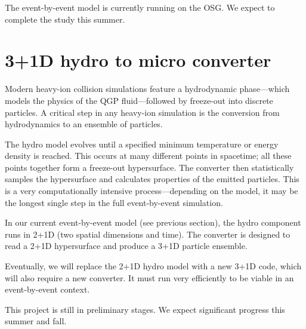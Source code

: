 \documentclass[twocolumn,10pt,amsmath]{revtex4-1}
\begin{document}
The event-by-event model is currently running on the OSG.  We expect to complete the study this summer.




\section{3+1D hydro to micro converter}

Modern heavy-ion collision simulations feature a hydrodynamic phase---which models the physics of the QGP fluid---followed by freeze-out into discrete
particles.  A critical step in any heavy-ion simulation is the conversion from hydrodynamics to an ensemble of particles.

The hydro model evolves until a specified minimum temperature or energy density is reached.  This occurs at many different points in spacetime; all these points
together form a freeze-out hypersurface.  The converter then statistically samples the hypersurface and calculates properties of the emitted particles.  This
is a very computationally intensive process---depending on the model, it may be the longest single step in the full event-by-event simulation.

In our current event-by-event model (see previous section), the hydro component runs in 2+1D (two spatial dimensions and time).  The converter is
designed to read a 2+1D hypersurface and produce a 3+1D particle ensemble.

Eventually, we will replace the 2+1D hydro model with a new 3+1D code, which will also require a new converter.  It must run very efficiently to be viable in an
event-by-event context.

This project is still in preliminary stages.  We expect significant progress this summer and fall.
\end{document}
